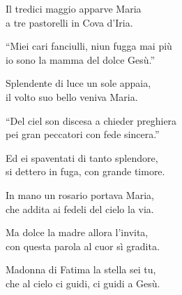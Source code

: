 
\strofa Il tredici maggio apparve Maria\\
a tre pastorelli in Cova d'Iria.

\spazio


\spazio

\strofa ``Miei cari fanciulli, niun fugga mai più\\
io sono la mamma del dolce Gesù.''

\spazio


\spazio

\strofa Splendente di luce un sole appaia,\\
il volto suo bello veniva Maria.

\spazio


\spazio

\strofa ``Del ciel son discesa a chieder preghiera\\
pei gran peccatori con fede sincera.''

\spazio


\spazio

\strofa Ed ei spaventati di tanto splendore,\\
si dettero in fuga, con grande timore.

\spazio


\spazio

\strofa In mano un rosario portava Maria,\\
che addita ai fedeli del cielo la via.

\spazio


\spazio

\strofa Ma dolce la madre allora l'invita,\\
con questa parola al cuor sì gradita.

\spazio


\spazio

\strofa Madonna di Fatima la stella sei tu,\\
che al cielo ci guidi, ci guidi a Gesù.

\spazio

